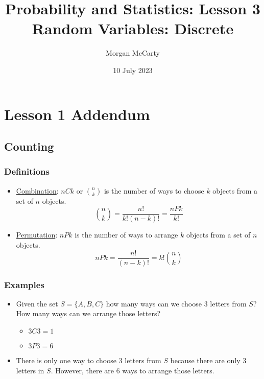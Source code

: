 \documentclass[12pt]{article}
\title{
    Probability and Statistics: Lesson 3
    \\Random Variables: Discrete}
\author{Morgan McCarty}
\date{10 July 2023}
\begin{document}
    \maketitle

    \section{Lesson 1 Addendum}
        \subsection{Counting}
            \subsubsection{Definitions}
                \begin{itemize}
                    \item \underline{Combination}: $nCk$ or $\binom{n}{k}$ is the number of ways to choose $k$ objects from a set of $n$ objects. \\
                    \begin{equation}
                        \binom{n}{k} = \frac{n!}{k!(n-k)!} = \frac{nPk}{k!}
                    \end{equation}
                    \item \underline{Permutation}: $nPk$ is the number of ways to arrange $k$ objects from a set of $n$ objects.
                    \begin{equation}
                        nPk = \frac{n!}{(n-k)!} = k!\binom{n}{k}
                    \end{equation}
                \end{itemize}
            \subsubsection{Examples}
                \begin{itemize}
                    \item Given the set $S = \{A, B, C\}$ how many ways can we choose $3$ letters from $S$? How many ways can we arrange those letters?
                    \begin{itemize}
                        \item $3C3 = 1$
                        \item $3P3 = 6$
                    \end{itemize}
                    \item There is only one way to choose $3$ letters from $S$ because there are only $3$ letters in $S$. However, there are $6$ ways to arrange those letters.
                \end{itemize}
\end{document}
